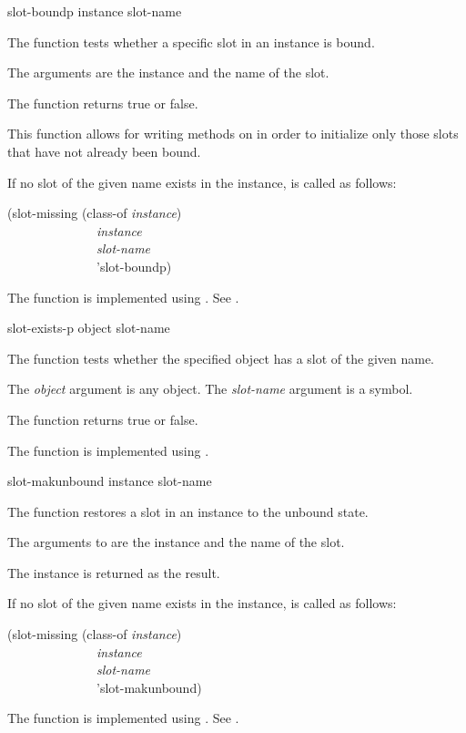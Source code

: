 \begin{defun}[Function]
slot-boundp instance slot-name

The function  tests whether a specific slot in an
instance is bound.

The arguments are the instance and the name of the slot.

The function  returns true or false.

This function allows for writing 
methods on  in order to initialize only
those slots that have not already been bound.

If no slot of the given name exists in the instance, 
is called as follows:
\begin{lisp}
(slot-missing (class-of \emph{instance}) \\
~~~~~~~~~~~~~~\emph{instance} \\
~~~~~~~~~~~~~~\emph{slot-name} \\
~~~~~~~~~~~~~~'slot-boundp)
\end{lisp}

The function  is implemented using 
.
See .
\end{defun}


\begin{defun}[Function]
slot-exists-p object slot-name

The function  tests whether the specified object has
a slot of the given name.

The \emph{object} argument is any object.  The \emph{slot-name} argument
is a symbol.

The function  returns true or false.

The function  is implemented using 
.
\end{defun}


\begin{defun}[Function]
slot-makunbound instance slot-name

The function  restores a slot in an instance to
the unbound state.

The arguments to  are the instance and the name of
the slot.

The instance is returned as the result.

If no slot of the given name exists in the instance, 
is called as follows:
\begin{lisp}
(slot-missing (class-of \emph{instance}) \\
~~~~~~~~~~~~~~\emph{instance} \\
~~~~~~~~~~~~~~\emph{slot-name} \\
~~~~~~~~~~~~~~'slot-makunbound)
\end{lisp}

The function  is implemented using 
.
See .
\end{defun}

